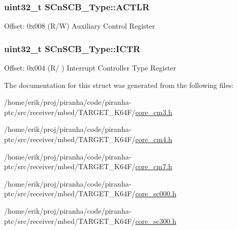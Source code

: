 \subsubsection[{\texorpdfstring{A\+C\+T\+LR}{ACTLR}}]{ uint32\+\_\+t S\+Cn\+S\+C\+B\+\_\+\+Type\+::\+A\+C\+T\+LR}\hypertarget{structSCnSCB__Type_aacadedade30422fed705e8dfc8e6cd8d}{}\label{structSCnSCB__Type_aacadedade30422fed705e8dfc8e6cd8d}
Offset\+: 0x008 (R/W) Auxiliary Control Register 
\subsubsection[{\texorpdfstring{I\+C\+TR}{ICTR}}]{ uint32\+\_\+t S\+Cn\+S\+C\+B\+\_\+\+Type\+::\+I\+C\+TR}\hypertarget{structSCnSCB__Type_ad99a25f5d4c163d9005ca607c24f6a98}{}\label{structSCnSCB__Type_ad99a25f5d4c163d9005ca607c24f6a98}
Offset\+: 0x004 (R/ ) Interrupt Controller Type Register 

The documentation for this struct was generated from the following files\+:\begin{DoxyCompactItemize}
\item 
/home/erik/proj/piranha/code/piranha-\/ptc/src/receiver/mbed/\+T\+A\+R\+G\+E\+T\+\_\+\+K64\+F/\hyperlink{core__cm3_8h}{core\+\_\+cm3.\+h}\item 
/home/erik/proj/piranha/code/piranha-\/ptc/src/receiver/mbed/\+T\+A\+R\+G\+E\+T\+\_\+\+K64\+F/\hyperlink{core__cm4_8h}{core\+\_\+cm4.\+h}\item 
/home/erik/proj/piranha/code/piranha-\/ptc/src/receiver/mbed/\+T\+A\+R\+G\+E\+T\+\_\+\+K64\+F/\hyperlink{core__cm7_8h}{core\+\_\+cm7.\+h}\item 
/home/erik/proj/piranha/code/piranha-\/ptc/src/receiver/mbed/\+T\+A\+R\+G\+E\+T\+\_\+\+K64\+F/\hyperlink{core__sc000_8h}{core\+\_\+sc000.\+h}\item 
/home/erik/proj/piranha/code/piranha-\/ptc/src/receiver/mbed/\+T\+A\+R\+G\+E\+T\+\_\+\+K64\+F/\hyperlink{core__sc300_8h}{core\+\_\+sc300.\+h}\end{DoxyCompactItemize}
